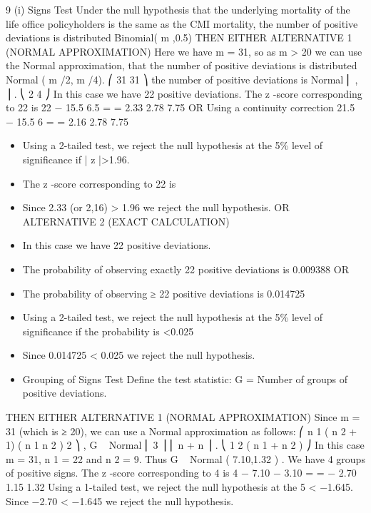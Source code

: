 \documentclass[a4paper,12pt]{article}
\begin{document}
\begin{enumerate}
\begin{enumerate}[(i)]

\newpage

9
(i)
Signs Test
Under the null hypothesis that the underlying mortality of the life office policyholders
is the same as the CMI mortality,
the number of positive deviations is distributed Binomial( m ,0.5)
THEN EITHER ALTERNATIVE 1 (NORMAL APPROXIMATION)
Here we have m = 31, so as m > 20 we can use the Normal approximation, that the
number of positive deviations is distributed Normal ( m /2, m /4).
⎛ 31 31 ⎞
the number of positive deviations is Normal ⎜ , ⎟ .
⎝ 2 4 ⎠
In this case we have 22 positive deviations.
The z -score corresponding to 22 is
22 − 15.5 6.5
=
= 2.33
2.78
7.75
OR Using a continuity correction
21.5 − 15.5
6
=
= 2.16
2.78
7.75
\begin{itemize}
\item Using a 2-tailed test, we reject the null hypothesis at the 5\% level of
significance if | z |>1.96.
\item The z -score corresponding to 22 is
\item Since 2.33 (or 2,16) > 1.96 we reject the null hypothesis.
OR ALTERNATIVE 2 (EXACT CALCULATION)
\item In this case we have 22 positive deviations.
\item The probability of observing exactly 22 positive deviations is 0.009388
OR
\item The probability of observing ≥ 22 positive deviations is 0.014725
\item Using a 2-tailed test, we reject the null hypothesis at the 5\% level of significance if the probability is <0.025
\item Since 0.014725 < 0.025 we reject the null hypothesis.
\item Grouping of Signs Test
Define the test statistic:
G = Number of groups of positive deviations.
\end{itemize}
THEN EITHER ALTERNATIVE 1 (NORMAL APPROXIMATION)
Since m = 31 (which is ≥ 20), we can use a Normal approximation as follows:
⎛ n 1 ( n 2 + 1) ( n 1 n 2 ) 2 ⎞
,
G ~ Normal ⎜
3 ⎟
⎜ n + n
⎟ .
⎝ 1 2 ( n 1 + n 2 ) ⎠
In this case m = 31, n 1 = 22 and n 2 = 9.
Thus G ~ Normal ( 7.10,1.32 ) .
We have 4 groups of positive signs.
The z -score corresponding to 4 is
4 − 7.10 − 3.10
=
= − 2.70
1.15
1.32
Using a 1-tailed test, we reject the null hypothesis at the 5%
< −1.645.
Since −2.70 < −1.645 we reject the null hypothesis.

\end{enumerate}
\end{enumerate}
\end{document}
